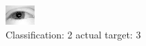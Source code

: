 \begin{figure}[h!]
\begin{center}
\includegraphics[width=0.60\columnwidth]{figures/ID2386_class_2_target_3.png}
\end{center}
\caption{ Classification: 2 actual target: 3}
\label{fig:ID2386_class_2_target_3}
\end{figure}
